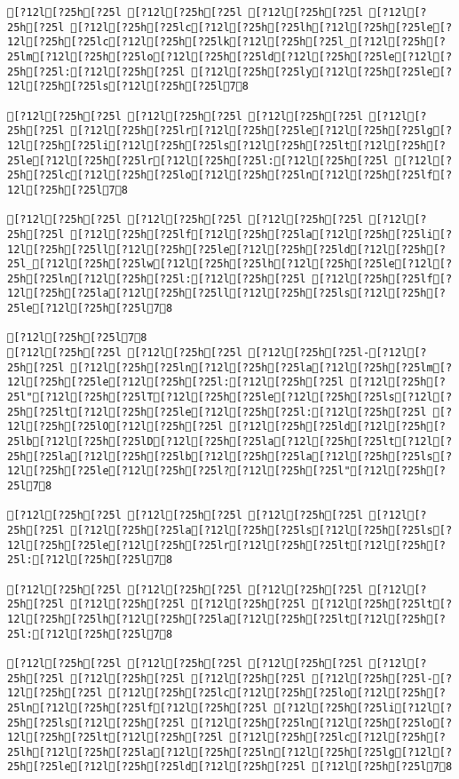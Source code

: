 \documentclass{scrartcl}
\begin{document}
\begin{Verbatim}
[?12l[?25h[?25l [?12l[?25h[?25l [?12l[?25h[?25l [?12l[?25h[?25l [?12l[?25h[?25lc[?12l[?25h[?25lh[?12l[?25h[?25le[?12l[?25h[?25lc[?12l[?25h[?25lk[?12l[?25h[?25l_[?12l[?25h[?25lm[?12l[?25h[?25lo[?12l[?25h[?25ld[?12l[?25h[?25le[?12l[?25h[?25l:[?12l[?25h[?25l [?12l[?25h[?25ly[?12l[?25h[?25le[?12l[?25h[?25ls[?12l[?25h[?25l78

[?12l[?25h[?25l [?12l[?25h[?25l [?12l[?25h[?25l [?12l[?25h[?25l [?12l[?25h[?25lr[?12l[?25h[?25le[?12l[?25h[?25lg[?12l[?25h[?25li[?12l[?25h[?25ls[?12l[?25h[?25lt[?12l[?25h[?25le[?12l[?25h[?25lr[?12l[?25h[?25l:[?12l[?25h[?25l [?12l[?25h[?25lc[?12l[?25h[?25lo[?12l[?25h[?25ln[?12l[?25h[?25lf[?12l[?25h[?25l78

[?12l[?25h[?25l [?12l[?25h[?25l [?12l[?25h[?25l [?12l[?25h[?25l [?12l[?25h[?25lf[?12l[?25h[?25la[?12l[?25h[?25li[?12l[?25h[?25ll[?12l[?25h[?25le[?12l[?25h[?25ld[?12l[?25h[?25l_[?12l[?25h[?25lw[?12l[?25h[?25lh[?12l[?25h[?25le[?12l[?25h[?25ln[?12l[?25h[?25l:[?12l[?25h[?25l [?12l[?25h[?25lf[?12l[?25h[?25la[?12l[?25h[?25ll[?12l[?25h[?25ls[?12l[?25h[?25le[?12l[?25h[?25l78

[?12l[?25h[?25l78
[?12l[?25h[?25l [?12l[?25h[?25l [?12l[?25h[?25l-[?12l[?25h[?25l [?12l[?25h[?25ln[?12l[?25h[?25la[?12l[?25h[?25lm[?12l[?25h[?25le[?12l[?25h[?25l:[?12l[?25h[?25l [?12l[?25h[?25l"[?12l[?25h[?25lT[?12l[?25h[?25le[?12l[?25h[?25ls[?12l[?25h[?25lt[?12l[?25h[?25le[?12l[?25h[?25l:[?12l[?25h[?25l [?12l[?25h[?25lO[?12l[?25h[?25l [?12l[?25h[?25ld[?12l[?25h[?25lb[?12l[?25h[?25lD[?12l[?25h[?25la[?12l[?25h[?25lt[?12l[?25h[?25la[?12l[?25h[?25lb[?12l[?25h[?25la[?12l[?25h[?25ls[?12l[?25h[?25le[?12l[?25h[?25l?[?12l[?25h[?25l"[?12l[?25h[?25l78

[?12l[?25h[?25l [?12l[?25h[?25l [?12l[?25h[?25l [?12l[?25h[?25l [?12l[?25h[?25la[?12l[?25h[?25ls[?12l[?25h[?25ls[?12l[?25h[?25le[?12l[?25h[?25lr[?12l[?25h[?25lt[?12l[?25h[?25l:[?12l[?25h[?25l78

[?12l[?25h[?25l [?12l[?25h[?25l [?12l[?25h[?25l [?12l[?25h[?25l [?12l[?25h[?25l [?12l[?25h[?25l [?12l[?25h[?25lt[?12l[?25h[?25lh[?12l[?25h[?25la[?12l[?25h[?25lt[?12l[?25h[?25l:[?12l[?25h[?25l78

[?12l[?25h[?25l [?12l[?25h[?25l [?12l[?25h[?25l [?12l[?25h[?25l [?12l[?25h[?25l [?12l[?25h[?25l [?12l[?25h[?25l-[?12l[?25h[?25l [?12l[?25h[?25lc[?12l[?25h[?25lo[?12l[?25h[?25ln[?12l[?25h[?25lf[?12l[?25h[?25l [?12l[?25h[?25li[?12l[?25h[?25ls[?12l[?25h[?25l [?12l[?25h[?25ln[?12l[?25h[?25lo[?12l[?25h[?25lt[?12l[?25h[?25l [?12l[?25h[?25lc[?12l[?25h[?25lh[?12l[?25h[?25la[?12l[?25h[?25ln[?12l[?25h[?25lg[?12l[?25h[?25le[?12l[?25h[?25ld[?12l[?25h[?25l [?12l[?25h[?25l78


\end{Verbatim}
\end{document}
